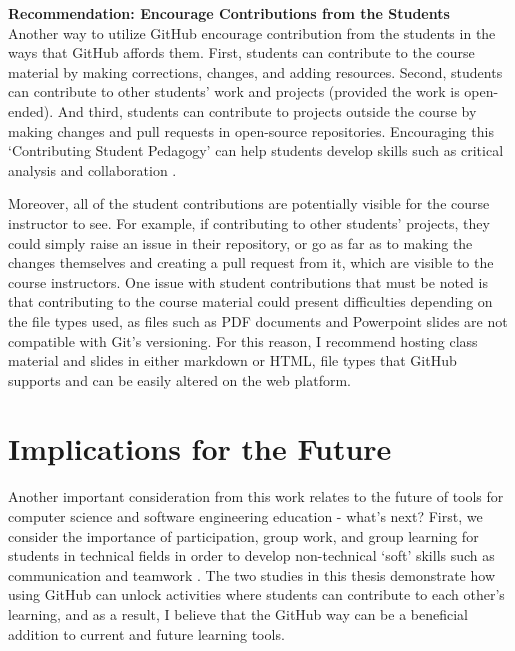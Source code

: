 \textbf{Recommendation: Encourage Contributions from the Students} \\
Another way to utilize GitHub  encourage contribution from the students in the ways that GitHub affords them. First, students can contribute to the course material by making corrections, changes, and adding resources. Second, students can contribute to other students' work and projects (provided the work is open-ended). And third, students can contribute to projects outside the course by making changes and pull requests in open-source repositories. Encouraging this `Contributing Student Pedagogy' can help students develop skills such as critical analysis and collaboration \cite{falkner2012supporting}.

Moreover, all of the student contributions are potentially visible for the course instructor to see. For example, if contributing to other students' projects, they could simply raise an issue in their repository, or go as far as to making the changes themselves and creating a pull request from it, which are visible to the course instructors. One issue with student contributions that must be noted is that contributing to the course material could present difficulties depending on the file types used, as files such as PDF documents and Powerpoint slides are not compatible with Git's versioning. For this reason, I recommend hosting class material and slides in either markdown or HTML, file types that GitHub supports and can be easily altered on the web platform.

\section{Implications for the Future}
Another important consideration from this work relates to the future of tools for computer science and software engineering education - what's next? First, we consider the importance of participation, group work, and group learning for students in technical fields in order to develop non-technical `soft' skills such as communication and teamwork \cite{jazayeri2004education}. The two studies in this thesis demonstrate how using GitHub can unlock activities where students can contribute to each other's learning, and as a result, I believe that the GitHub way can be a beneficial addition to current and future learning tools.

